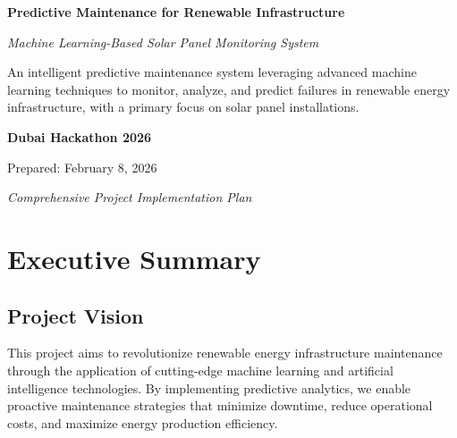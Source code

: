 \documentclass[12pt,a4paper]{article}
\begin{document}
\begin{titlepage}
    \centering
    \vspace*{2cm}
    
    {\Huge\bfseries Predictive Maintenance for Renewable Infrastructure\par}
    \vspace{1cm}
    {\Large\itshape Machine Learning-Based Solar Panel Monitoring System\par}
    \vspace{2cm}
    
    \begin{tcolorbox}[colback=primarycolor!5!white,colframe=primarycolor!75!black,title=Project Overview]
    An intelligent predictive maintenance system leveraging advanced machine learning techniques to monitor, analyze, and predict failures in renewable energy infrastructure, with a primary focus on solar panel installations.
    \end{tcolorbox}
    
    \vspace{2cm}
    
    {\Large\textbf{Dubai Hackathon 2026}\par}
    \vspace{0.5cm}
    {\large Prepared: February 8, 2026\par}
    
    \vfill
    
    {\large\textit{Comprehensive Project Implementation Plan}\par}
\end{titlepage}

\tableofcontents
\newpage

\section{Executive Summary}

\subsection{Project Vision}
This project aims to revolutionize renewable energy infrastructure maintenance through the application of cutting-edge machine learning and artificial intelligence technologies. By implementing predictive analytics, we enable proactive maintenance strategies that minimize downtime, reduce operational costs, and maximize energy production efficiency.
\end{document}
